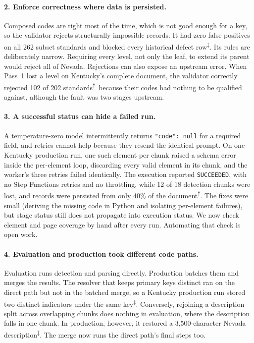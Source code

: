 \documentclass[11pt]{article}
\newcommand{\elog}{\textsuperscript{$\ddagger$}}
\begin{document}
\paragraph{2. Enforce correctness where data is persisted.}
Composed codes are right most of the time, which is not good enough for a key,
so the validator rejects structurally impossible records. It had zero false positives on all 262 subset
standards and blocked every historical defect row\elog.
Its rules are deliberately narrow. Requiring every level, not only the leaf, to extend its parent would reject all of Nevada. Rejections can also expose an upstream error. When Pass~1 lost a level on Kentucky's complete document, the validator correctly rejected 102 of 202 standards\elog\ because their codes had nothing to be qualified against, although the fault was two stages upstream.

\paragraph{3. A successful status can hide a failed run.} A temperature-zero model intermittently returns \texttt{"code": null} for a required field, and retries cannot help because they resend the identical prompt. On one Kentucky production run, one such element per chunk raised a schema error inside the per-element loop, discarding every valid element in its chunk, and the worker's three retries failed identically. The execution reported \texttt{SUCCEEDED}, with no Step Functions retries and no throttling, while 12 of 18 detection chunks were lost, and records were persisted from only 40\% of the document\elog. The fixes were small (deriving the missing code in Python and isolating per-element failures), but stage status still does not propagate into execution status. We now check element and page coverage by hand after every run. Automating that check is open work.

\paragraph{4. Evaluation and production took different code paths.} Evaluation
runs detection and parsing directly. Production batches them and merges the
results. The resolver that keeps primary keys distinct ran on the direct path but not in the batched merge, so a Kentucky production run stored two distinct indicators
under the same key\elog. Conversely, rejoining a description split
across overlapping chunks does nothing in evaluation, where the description
falls in one chunk. In production, however, it restored a 3{,}500-character Nevada
description\elog. The merge now runs the direct path's final steps too.
\end{document}
